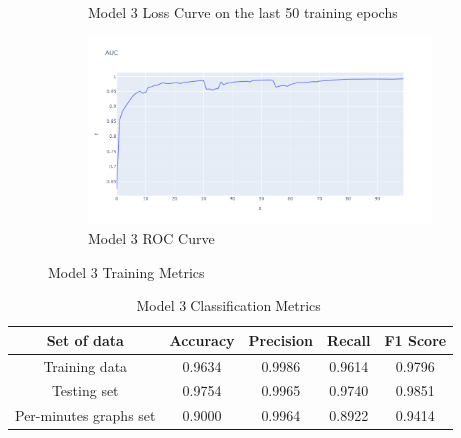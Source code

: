 \begin{figure}[H]
\begin{subfigure}{0.49\textwidth}
        \caption{Model 3 Loss Curve on the last 50 training epochs}
    \label{fig:3_ploss}
    \end{subfigure}
    \begin{subfigure}{0.49\textwidth}
        \centering
        \includegraphics[width=\linewidth]{figures/ev/3_auc.png}
        \caption{Model 3 ROC Curve}
    \label{fig:3_auc}
    \end{subfigure}
\captionsetup{font=large}
\caption{Model 3 Training Metrics}
 \label{fig:3_tr}
\end{figure}
\begin{table}[H]%
\centering
\begin{tabular}{|c|c|c|c|c|}
\hline
Set of data & Accuracy & Precision & Recall & F1 Score \\
\hline
Training data  & 0.9634 & 0.9986 & 0.9614 & 0.9796 \\
\hline
Testing set & 0.9754 & 0.9965 & 0.9740 & 0.9851 \\
\hline
Per-minutes graphs set & 0.9000 & 0.9964 & 0.8922 & 0.9414 \\
\hline
\end{tabular}
\caption{Model 3\textcolor{white}{.}Classification\textcolor{white}{.}Metrics\textcolor{white}{.}}
\label{M3_tab}
\end{table}
